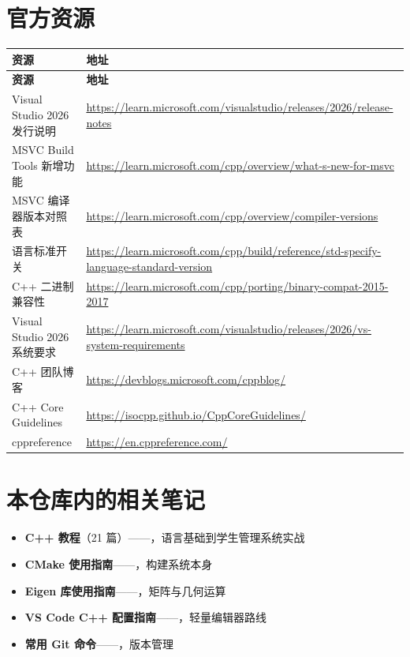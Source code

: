 \section{官方资源}

\begin{longtable}{L{6.4cm}L{8.2cm}}
\toprule
\textbf{资源} & \textbf{地址} \\
\midrule
\endfirsthead
\toprule
\textbf{资源} & \textbf{地址} \\
\midrule
\endhead
\bottomrule
\endlastfoot
Visual Studio 2026 发行说明 & \url{https://learn.microsoft.com/visualstudio/releases/2026/release-notes} \\
MSVC Build Tools 新增功能 & \url{https://learn.microsoft.com/cpp/overview/what-s-new-for-msvc} \\
MSVC 编译器版本对照表 & \url{https://learn.microsoft.com/cpp/overview/compiler-versions} \\
 语言标准开关 & \url{https://learn.microsoft.com/cpp/build/reference/std-specify-language-standard-version} \\
C++ 二进制兼容性 & \url{https://learn.microsoft.com/cpp/porting/binary-compat-2015-2017} \\
Visual Studio 2026 系统要求 & \url{https://learn.microsoft.com/visualstudio/releases/2026/vs-system-requirements} \\
C++ 团队博客 & \url{https://devblogs.microsoft.com/cppblog/} \\
C++ Core Guidelines & \url{https://isocpp.github.io/CppCoreGuidelines/} \\
cppreference & \url{https://en.cppreference.com/} \\
\end{longtable}

\section{本仓库内的相关笔记}

\begin{itemize}
	\item \textbf{C++ 教程}（21 篇）——，语言基础到学生管理系统实战
	\item \textbf{CMake 使用指南}——，构建系统本身
	\item \textbf{Eigen 库使用指南}——，矩阵与几何运算
	\item \textbf{VS Code C++ 配置指南}——，轻量编辑器路线
	\item \textbf{常用 Git 命令}——，版本管理
\end{itemize}
